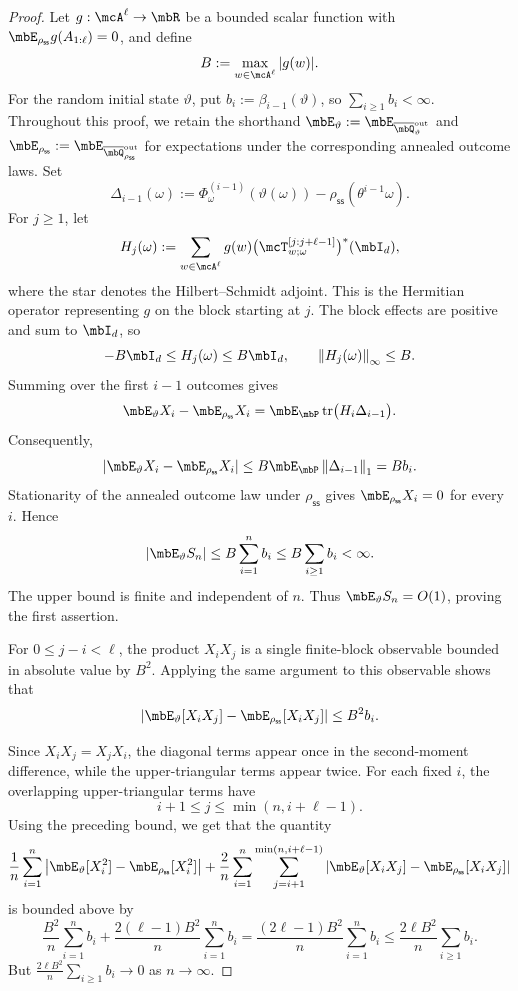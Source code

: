 \documentclass[a4paper]{article}
\numberwithin{equation}{section}   %
\theoremstyle{plain}   %
\theoremstyle{plain}   %
\theoremstyle{examplestyle}
\DeclareMathOperator{\pr}{\mbP}           %
\newcommand{\s}{\rho_{\mathsf{ss}}}     %
\DeclareMathOperator{\str}{tr} %
\newcommand{\unorm}[1]{\left\lVert#1\right\rVert}
\begin{document}
\begin{proof}
    Let $g:\mcA^\ell\to\mbR$ be a bounded scalar function with  $\mbE_{\s}g(A_{1:\ell})=0$, and define
    \[
        B:=\max_{w\in\mcA^\ell}|g(w)|.
    \]
    For the random initial state $\vartheta$, put $b_i:=\beta_{i-1}(\vartheta)$, so $\sum_{i\ge1}b_i<\infty$.
    Throughout this proof, we retain the shorthand $\mbE_\vartheta :=\mbE_{\overline\mbQ^{\mathrm{out}}_\vartheta}$ and $\mbE_{\s} :=\mbE_{\overline\mbQ^{\mathrm{out}}_{\s}}$ for expectations under the corresponding annealed outcome laws.
    Set
    \[
        \Delta_{i-1}(\omega)
        :=
        \Phi^{(i-1)}_\omega(\vartheta(\omega))
        -
        \s(\theta^{i-1}\omega).
    \]
    For $j\ge1$, let
    \[
        H_j(\omega)
        :=
        \sum_{w\in\mcA^\ell}
            g(w)
            \bigl(\mcT^{[j:j+\ell-1]}_{w;\omega}\bigr)^*
            (\mbI_d),
    \]
    where the star denotes the Hilbert--Schmidt adjoint.
    This is the Hermitian operator representing $g$ on the block starting at $j$.
    The block effects are positive and sum to $\mbI_d$, so
    \[
        -B\mbI_d\le H_j(\omega)\le B\mbI_d,
        \qquad
        \unorm{H_j(\omega)}_\infty\le B.
    \]
    Summing over the first $i-1$ outcomes gives
    \[
        \mbE_\vartheta X_i-\mbE_{\s}X_i
        =
        \mbE_{\pr}
            \str\bigl(H_i\Delta_{i-1}\bigr).
    \]
    Consequently,
    \[
        |\mbE_\vartheta X_i-\mbE_{\s}X_i|
        \le
        B\mbE_{\pr}\unorm{\Delta_{i-1}}_1
        =
        Bb_i.
    \]
    Stationarity of the annealed outcome law under $\s$ gives $\mbE_{\s}X_i=0$ for every $i$. 
    Hence
    \[
        |\mbE_\vartheta S_n|
        \le
        B\sum_{i=1}^n b_i
        \le
        B\sum_{i\ge1}b_i<\infty.
    \]
    The upper bound is finite and independent of $n$.
    Thus $\mbE_\vartheta S_n=O(1)$, proving the first assertion.

    For $0\le j-i<\ell$, the product $X_iX_j$ is a single finite-block observable bounded in absolute value by $B^2$.
    Applying the same argument to this observable shows that
    \[
        \left|
            \mbE_\vartheta[X_iX_j]
            -
            \mbE_{\s}[X_iX_j]
        \right|
        \le B^2b_i.
    \]

    Since $X_iX_j=X_jX_i$, the diagonal terms appear once in the second-moment difference, while the upper-triangular terms appear twice. For each fixed $i$, the overlapping upper-triangular terms have
    \[
        i+1\le j\le\min(n,i+\ell-1).
    \]
    Using the preceding bound, we get that the quantity 
    \[
        \frac1n\sum_{i=1}^n
            \left|
                \mbE_\vartheta[X_i^2]
                -
                \mbE_{\s}[X_i^2]
            \right|
        +
        \frac2n\sum_{i=1}^n
        \sum_{j=i+1}^{\min(n,i+\ell-1)}
            \left|
                \mbE_\vartheta[X_iX_j]
                -
                \mbE_{\s}[X_iX_j]
            \right|
    \]
    is bounded above by 
    \[
        \frac{B^2}{n}\sum_{i=1}^n b_i
        +
        \frac{2(\ell-1)B^2}{n}\sum_{i=1}^n b_i
        =
        \frac{(2\ell-1)B^2}{n}\sum_{i=1}^n b_i
        \le
        \frac{2\ell B^2}{n}\sum_{i\ge1}b_i.
    \]
    But $\frac{2\ell B^2}{n}\sum_{i\ge1}b_i\to 0$ as $n\to\infty$. 


\end{proof}
\end{document}
